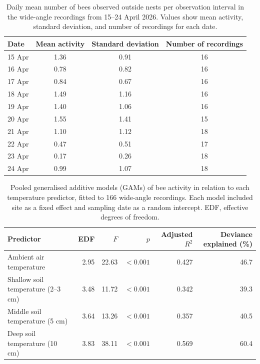 \documentclass[11pt,a4paper]{article}
\begin{document}

\begin{table}[!htbp]
\centering
\caption{Daily mean number of bees observed outside nests per observation interval in the wide-angle recordings from 15--24 April 2026. Values show mean activity, standard deviation, and number of recordings for each date.}
\label{tab:daily_activity}

\begin{tabular}{lccc}
\toprule
Date & Mean activity & Standard deviation & Number of recordings \\
\midrule
15 Apr & 1.36 & 0.91 & 16 \\
16 Apr & 0.78 & 0.82 & 16 \\
17 Apr & 0.84 & 0.67 & 16 \\
18 Apr & 1.49 & 1.16 & 16 \\
19 Apr & 1.40 & 1.06 & 16 \\
20 Apr & 1.55 & 1.41 & 15 \\
21 Apr & 1.10 & 1.12 & 18 \\
22 Apr & 0.47 & 0.51 & 17 \\
23 Apr & 0.17 & 0.26 & 18 \\
24 Apr & 0.99 & 1.07 & 18 \\
\bottomrule
\end{tabular}
\end{table}


\begin{table}[!htbp]
\centering
\small
\caption{Pooled generalised additive models (GAMs) of bee activity in relation to each temperature predictor, fitted to 166 wide-angle recordings. Each model included site as a fixed effect and sampling date as a random intercept. EDF, effective degrees of freedom.}
\label{tab:behavioural_gam}

\begin{tabular}{lrrrrr}
\toprule
Predictor & EDF & $F$ & $p$ & Adjusted $R^2$ & Deviance explained (\%) \\
\midrule
Ambient air temperature & 2.95 & 22.63 & $<0.001$ & 0.427 & 46.7 \\
Shallow soil temperature (2--3 cm) & 3.48 & 11.72 & $<0.001$ & 0.342 & 39.3 \\
Middle soil temperature (5 cm) & 3.64 & 13.26 & $<0.001$ & 0.357 & 40.5 \\
Deep soil temperature (10 cm) & 3.83 & 38.11 & $<0.001$ & 0.569 & 60.4 \\
\bottomrule
\end{tabular}
\end{table}
\end{document}
